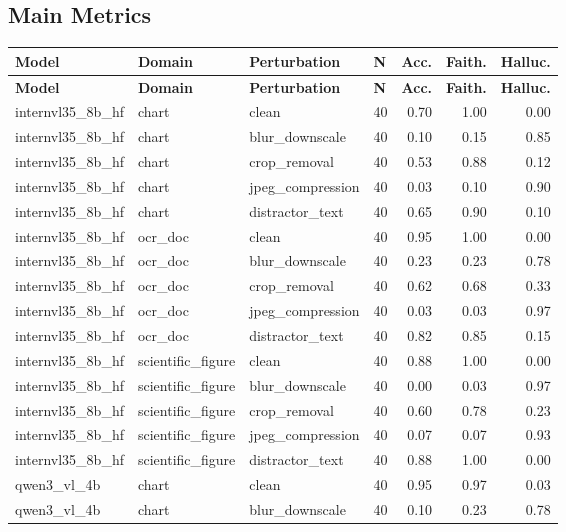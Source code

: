 \documentclass{article}
\begin{document}
\subsection{Main Metrics}

\begingroup
\footnotesize
\setlength{\tabcolsep}{3pt}
\begin{longtable}{llllrrr}
\hline
\textbf{Model} & \textbf{Domain} & \textbf{Perturbation} & \textbf{N} & \textbf{Acc.} & \textbf{Faith.} & \textbf{Halluc.} \\
\hline
\endfirsthead
\hline
\textbf{Model} & \textbf{Domain} & \textbf{Perturbation} & \textbf{N} & \textbf{Acc.} & \textbf{Faith.} & \textbf{Halluc.} \\
\hline
\endhead
internvl35\_8b\_hf & chart & clean & 40 & 0.70 & 1.00 & 0.00 \\
internvl35\_8b\_hf & chart & blur\_downscale & 40 & 0.10 & 0.15 & 0.85 \\
internvl35\_8b\_hf & chart & crop\_removal & 40 & 0.53 & 0.88 & 0.12 \\
internvl35\_8b\_hf & chart & jpeg\_compression & 40 & 0.03 & 0.10 & 0.90 \\
internvl35\_8b\_hf & chart & distractor\_text & 40 & 0.65 & 0.90 & 0.10 \\
internvl35\_8b\_hf & ocr\_doc & clean & 40 & 0.95 & 1.00 & 0.00 \\
internvl35\_8b\_hf & ocr\_doc & blur\_downscale & 40 & 0.23 & 0.23 & 0.78 \\
internvl35\_8b\_hf & ocr\_doc & crop\_removal & 40 & 0.62 & 0.68 & 0.33 \\
internvl35\_8b\_hf & ocr\_doc & jpeg\_compression & 40 & 0.03 & 0.03 & 0.97 \\
internvl35\_8b\_hf & ocr\_doc & distractor\_text & 40 & 0.82 & 0.85 & 0.15 \\
internvl35\_8b\_hf & scientific\_figure & clean & 40 & 0.88 & 1.00 & 0.00 \\
internvl35\_8b\_hf & scientific\_figure & blur\_downscale & 40 & 0.00 & 0.03 & 0.97 \\
internvl35\_8b\_hf & scientific\_figure & crop\_removal & 40 & 0.60 & 0.78 & 0.23 \\
internvl35\_8b\_hf & scientific\_figure & jpeg\_compression & 40 & 0.07 & 0.07 & 0.93 \\
internvl35\_8b\_hf & scientific\_figure & distractor\_text & 40 & 0.88 & 1.00 & 0.00 \\
qwen3\_vl\_4b & chart & clean & 40 & 0.95 & 0.97 & 0.03 \\
qwen3\_vl\_4b & chart & blur\_downscale & 40 & 0.10 & 0.23 & 0.78 \\

\end{longtable}
\end{document}
